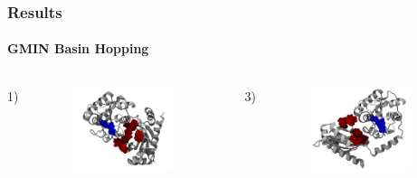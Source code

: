 \documentclass[english]{beamer}
\begin{document}
\begin{frame}
    \frametitle{Results}
    \framesubtitle{GMIN Basin Hopping} 

    \vspace{0.06\topmargin}

    \begin{columns}[t]
        1)
        \vspace{-4ex}
        \begin{figure}
            \includegraphics[width=0.85\textwidth]{figures/Complex_structures/structure1.png}  
        \end{figure}      
        3)
        \vspace{-8ex}
        \begin{figure}
            \includegraphics[width=0.85\textwidth]{figures/Complex_structures/structure3.png}   
        \end{figure}       


\end{columns}
\end{frame}
\end{document}
